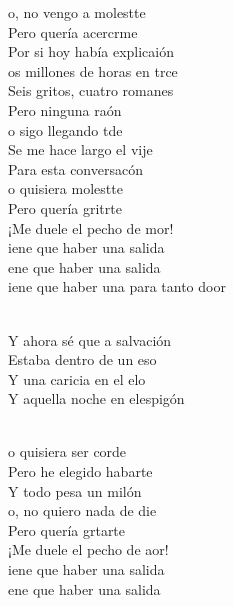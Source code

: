 \begin{cancion}%
	o, no vengo a molestte\\
	Pero quería acercrme\\
	Por si hoy había explicaión\\
\jump
	os millones de horas en trce\\
	Seis gritos, cuatro romanes\\
	Pero ninguna raón\\
\jump
	o sigo llegando tde\\
	Se me hace largo el vije\\
	Para esta conversacón\\
\jump
	o quisiera molestte\\
	Pero quería gritrte\\
	¡Me duele el pecho de mor!\\
\jump
	iene que haber una salida\\
	ene que haber una salida\\
	iene que haber una para tanto door\\\jump\\
	\begin{chorus}%
	Y ahora sé que a salvación\\
	Estaba dentro de un eso\\
	Y una caricia en el elo\\
	Y aquella noche en elespigón\\
	\end{chorus}%
	\jump\\
	o quisiera ser corde\\
	Pero he elegido habarte\\
	Y todo pesa un milón\\
\jump
	o, no quiero nada de die\\
	Pero quería grtarte\\
	¡Me duele el pecho de aor!\\
\jump
	iene que haber una salida\\
	ene que haber una salida\\

\end{cancion}
